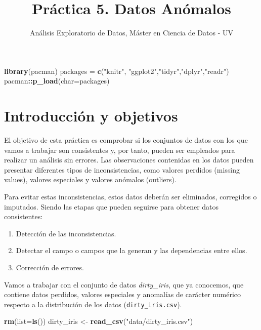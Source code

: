 \documentclass[
]{article}
\title{Práctica 5. Datos Anómalos}
\subtitle{Análisis Exploratorio de Datos, Máster en Ciencia de Datos -
UV}
\author{}
\date{\vspace{-2.5em}}
\newenvironment{Shaded}{\begin{snugshade}}{\end{snugshade}}
\newcommand{\AttributeTok}[1]{\textcolor[rgb]{0.13,0.29,0.53}{#1}}
\newcommand{\FunctionTok}[1]{\textcolor[rgb]{0.13,0.29,0.53}{\textbf{#1}}}
\newcommand{\NormalTok}[1]{#1}
\newcommand{\OtherTok}[1]{\textcolor[rgb]{0.56,0.35,0.01}{#1}}
\newcommand{\SpecialCharTok}[1]{\textcolor[rgb]{0.81,0.36,0.00}{\textbf{#1}}}
\newcommand{\StringTok}[1]{\textcolor[rgb]{0.31,0.60,0.02}{#1}}
\providecommand{\tightlist}{%
  \setlength{\itemsep}{0pt}\setlength{\parskip}{0pt}}
\begin{document}
\maketitle

{
\setcounter{tocdepth}{3}
\tableofcontents
}
\begin{Shaded}
\begin{Highlighting}[]
\FunctionTok{library}\NormalTok{(pacman)}
\NormalTok{packages }\OtherTok{=} \FunctionTok{c}\NormalTok{(}\StringTok{"knitr"}\NormalTok{, }\StringTok{"ggplot2"}\NormalTok{,}\StringTok{"tidyr"}\NormalTok{,}\StringTok{"dplyr"}\NormalTok{,}\StringTok{"readr"}\NormalTok{)}
\NormalTok{pacman}\SpecialCharTok{::}\FunctionTok{p\_load}\NormalTok{(}\AttributeTok{char=}\NormalTok{packages)}
\end{Highlighting}
\end{Shaded}

\section{Introducción y objetivos}\label{introducciuxf3n-y-objetivos}

El objetivo de esta práctica es comprobar si los conjuntos de datos con
los que vamos a trabajar son consistentes y, por tanto, pueden ser
empleados para realizar un análisis sin errores. Las observaciones
contenidas en los datos pueden presentar diferentes tipos de
inconsistencias, como valores perdidos (missing values), valores
especiales y valores anómalos (outliers).

Para evitar estas inconsistencias, estos datos deberán ser eliminados,
corregidos o imputados. Siendo las etapas que pueden seguirse para
obtener datos consistentes:

\begin{enumerate}
\def\labelenumi{\arabic{enumi}.}
\tightlist
\item
  Detección de las inconsistencias.
\item
  Detectar el campo o campos que la generan y las dependencias entre
  ellos.
\item
  Corrección de errores.
\end{enumerate}

Vamos a trabajar con el conjunto de datos \emph{dirty\_iris}, que ya
conocemos, que contiene datos perdidos, valores especiales y anomalías
de carácter numérico respecto a la distribución de los datos
(\texttt{dirty\_iris.csv}).

\begin{Shaded}
\begin{Highlighting}[]
\FunctionTok{rm}\NormalTok{(}\AttributeTok{list=}\FunctionTok{ls}\NormalTok{())}
\NormalTok{dirty\_iris }\OtherTok{\textless{}{-}} \FunctionTok{read\_csv}\NormalTok{(}\StringTok{"data/dirty\_iris.csv"}\NormalTok{)}
\end{Highlighting}
\end{Shaded}
\end{document}
